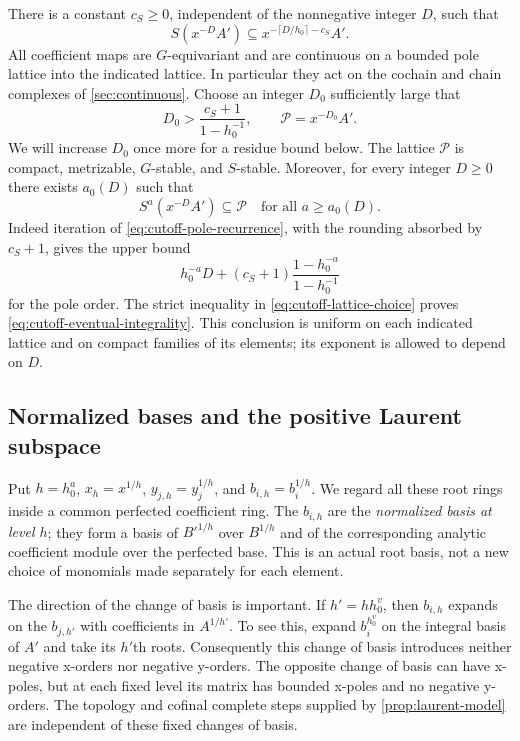 There is a constant $c_S\geq0$, independent of the nonnegative integer
$D$, such that
\begin{equation}
 S(x^{-D}A')\subseteq
 x^{-\lceil D/h_0\rceil-c_S}A'.
 \label{eq:cutoff-pole-recurrence}
\end{equation}
All coefficient maps are $G$-equivariant and are continuous on a
bounded pole lattice into the indicated lattice.  In particular they
act on the cochain and chain complexes of \cref{sec:continuous}.
Choose an integer $D_0$ sufficiently large that
\begin{equation}
 D_0>\frac{c_S+1}{1-h_0^{-1}},\qquad
 \mathcal P=x^{-D_0}A'.
 \label{eq:cutoff-lattice-choice}
\end{equation}
We will increase $D_0$ once more for a residue bound below.  The lattice
$\mathcal P$ is compact, metrizable, $G$-stable, and $S$-stable.
Moreover, for every integer $D\geq0$ there exists $a_0(D)$ such that
\begin{equation}
 S^a(x^{-D}A')\subseteq\mathcal P
 \quad\text{for all }a\geq a_0(D).
 \label{eq:cutoff-eventual-integrality}
\end{equation}
Indeed iteration of \cref{eq:cutoff-pole-recurrence}, with the rounding
absorbed by $c_S+1$, gives the upper bound
\[
 h_0^{-a}D+(c_S+1)\frac{1-h_0^{-a}}{1-h_0^{-1}}
\]
for the pole order.  The strict inequality in
\cref{eq:cutoff-lattice-choice} proves
\cref{eq:cutoff-eventual-integrality}.  This conclusion is uniform on
each indicated lattice and on compact families of its elements; its
exponent is allowed to depend on $D$.

\subsection{Normalized bases and the positive Laurent subspace}

Put $h=h_0^a$, $x_h=x^{1/h}$, $y_{j,h}=y_j^{1/h}$, and
$b_{i,h}=b_i^{1/h}$.  We regard all these root rings inside a common
perfected coefficient ring.  The $b_{i,h}$ are the
\emph{normalized basis at level $h$}; they form a basis of
$B'^{1/h}$ over $B^{1/h}$ and of the corresponding analytic coefficient
module over the perfected base.  This is an actual root basis, not a
new choice of monomials made separately for each element.

The direction of the change of basis is important.  If $h'=h h_0^v$,
then $b_{i,h}$ expands on the $b_{j,h'}$ with coefficients in
$A^{1/h'}$.  To see this, expand $b_i^{h_0^v}$ on the integral basis of
$A'$ and take its $h'$th roots.  Consequently this change of basis
introduces neither negative x-orders nor negative y-orders.  The
opposite change of basis can have x-poles, but at each fixed level its
matrix has bounded x-poles and no negative y-orders.  The topology and
cofinal complete steps supplied by \cref{prop:laurent-model} are
independent of these fixed changes of basis.

